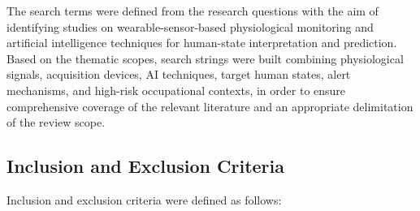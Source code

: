 \documentclass[runningheads]{llncs}
\begin{document}
The search terms were defined from the research questions with the aim of identifying studies on wearable-sensor-based physiological monitoring and artificial intelligence techniques for human-state interpretation and prediction. Based on the thematic scopes, search strings were built combining physiological signals, acquisition devices, AI techniques, target human states, alert mechanisms, and high-risk occupational contexts, in order to ensure comprehensive coverage of the relevant literature and an appropriate delimitation of the review scope.
\begin{table}[H]
\caption{Search terms by thematic scope}
\label{tab:termos}
\centering
{}
\end{table}

\subsection{Inclusion and Exclusion Criteria}


Inclusion and exclusion criteria were defined as follows:
\end{document}
